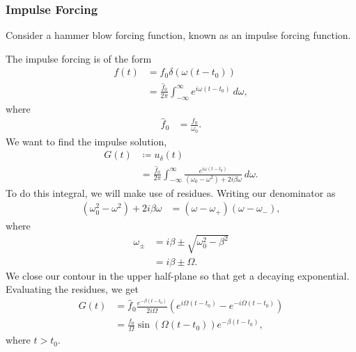 \documentclass[10pt]{mypackage}
\begin{document}
  \subsubsection{Impulse Forcing}%
  Consider a hammer blow forcing function, known as an impulse forcing function.\newline

  The impulse forcing is of the form
  \begin{align*}
    f(t) &= f_0\delta\left( \omega\left( t-t_0 \right) \right)\\
         &= \frac{\hat{f}_0}{2\pi} \int_{-\infty}^{\infty} e^{i\omega\left( t-t_0 \right)}\:d\omega,
  \end{align*}
  where
  \begin{align*}
    \hat{f}_0 &= \frac{f_0}{\omega_0}.
  \end{align*}
  We want to find the impulse solution,
  \begin{align*}
    G(t)&\coloneq u_{\delta}(t)\\
        &= \frac{\hat{f}_0}{2\pi} \int_{-\infty}^{\infty} \frac{e^{i\omega\left( t-t_0 \right)}}{\left( \omega_0 - \omega^2 \right) + 2i\beta\omega}\:d\omega.
  \end{align*}
  To do this integral, we will make use of residues. Writing our denominator as
  \begin{align*}
    \left( \omega_0^2 - \omega^2 \right) + 2i\beta\omega &= \left( \omega - \omega_{+} \right)\left( \omega - \omega_{-} \right),
  \end{align*}
  where
  \begin{align*}
    \omega_{\pm}  &= i\beta \pm \sqrt{\omega_0^2 - \beta^2}\\
                  &= i\beta\pm \Omega.
  \end{align*}
  We close our contour in the upper half-plane so that get a decaying exponential. Evaluating the residues, we get
  \begin{align*}
    G(t) &= \hat{f}_0 \frac{e^{-\beta\left( t-t_0 \right)}}{2i\Omega} \left( e^{i\Omega\left( t-t_0 \right)} - e^{-i\Omega\left( t-t_0 \right)}\right)\\
         &= \frac{f_0}{\Omega}\sin\left( \Omega\left( t-t_0 \right) \right)e^{-\beta\left( t-t_0 \right)},
  \end{align*}
  where $t > t_0$.\newline
\end{document}

